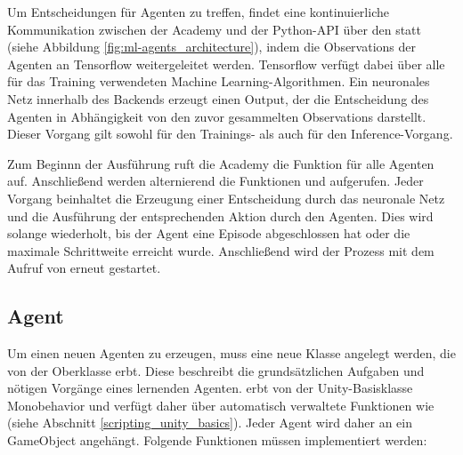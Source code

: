 Um Entscheidungen für Agenten zu treffen, findet eine kontinuierliche Kommunikation zwischen der Academy und der Python-API über den  statt (siehe Abbildung \ref{fig:ml-agents_architecture}), indem die Observations der Agenten an Tensorflow weitergeleitet werden. Tensorflow verfügt dabei über alle für das Training verwendeten Machine Learning-Algorithmen. Ein neuronales Netz innerhalb des Backends erzeugt einen Output, der die Entscheidung des Agenten in Abhängigkeit von den zuvor gesammelten Observations darstellt. Dieser Vorgang gilt sowohl für den Trainings- als auch für den Inference-Vorgang.

Zum Beginnn der Ausführung ruft die Academy die Funktion  für alle Agenten auf. Anschließend werden alternierend die Funktionen  und  aufgerufen. Jeder Vorgang beinhaltet die Erzeugung einer Entscheidung durch das neuronale Netz und die Ausführung der entsprechenden Aktion durch den Agenten. Dies wird solange wiederholt, bis der Agent eine Episode abgeschlossen hat oder die maximale Schrittweite erreicht wurde. Anschließend wird der Prozess mit dem Aufruf von  erneut gestartet.

\subsection{Agent}
Um einen neuen Agenten zu erzeugen, muss eine neue Klasse angelegt werden, die von der Oberklasse  erbt. Diese beschreibt die grundsätzlichen Aufgaben und nötigen Vorgänge eines lernenden Agenten.  erbt von der Unity-Basisklasse Monobehavior und verfügt daher über automatisch verwaltete Funktionen wie  (siehe Abschnitt \ref{scripting_unity_basics}). Jeder Agent wird daher an ein GameObject angehängt. Folgende Funktionen müssen implementiert werden:

